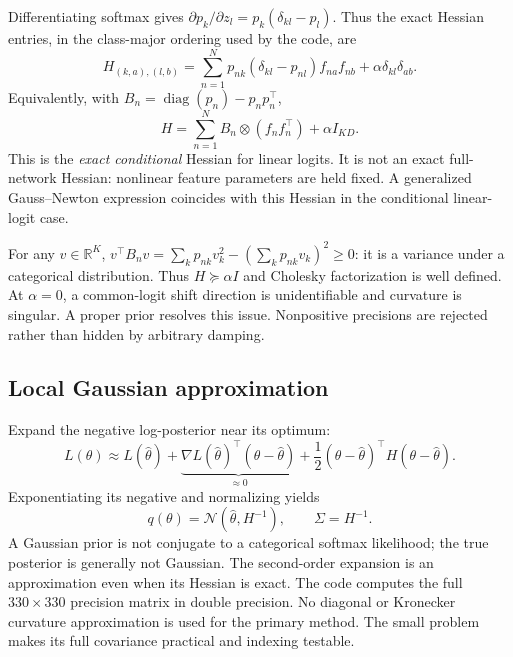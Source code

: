\documentclass[10pt,a4paper]{article}
\newcommand{\R}{\mathbb{R}}
\begin{document}
Differentiating softmax gives
$\partial p_k/\partial z_l=p_k(\delta_{kl}-p_l)$. Thus the exact Hessian
entries, in the class-major ordering used by the code, are
\begin{equation}\label{eq:hessian}
H_{(k,a),(l,b)}=
\sum_{n=1}^N p_{nk}(\delta_{kl}-p_{nl})f_{na}f_{nb}
+\alpha\delta_{kl}\delta_{ab}.
\end{equation}
Equivalently, with $B_n=\operatorname{diag}(p_n)-p_np_n^\top$,
\begin{equation}
H=\sum_{n=1}^N B_n\otimes(f_nf_n^\top)+\alpha I_{KD}.
\end{equation}
This is the \emph{exact conditional} Hessian for linear logits. It is not an
exact full-network Hessian: nonlinear feature parameters are held fixed.
A generalized Gauss--Newton expression coincides with this Hessian in
the conditional linear-logit case.

For any $v\in\R^K$,
$v^\top B_nv=\sum_kp_{nk}v_k^2-(\sum_kp_{nk}v_k)^2\geq0$:
it is a variance under a categorical distribution. Thus
$H\succeq\alpha I$ and Cholesky factorization is well defined. At $\alpha=0$,
a common-logit shift direction is unidentifiable and curvature is singular.
A proper prior resolves this issue. Nonpositive precisions are rejected
rather than hidden by arbitrary damping.

\subsection{Local Gaussian approximation}
Expand the negative log-posterior near its optimum:
\begin{equation}
L(\theta)\approx L(\hat\theta)+
\underbrace{\nabla L(\hat\theta)^\top(\theta-\hat\theta)}_{\approx0}
+\frac12(\theta-\hat\theta)^\top H(\theta-\hat\theta).
\end{equation}
Exponentiating its negative and normalizing yields
\begin{equation}
q(\theta)=\mathcal N(\hat\theta,H^{-1}),\qquad \Sigma=H^{-1}.
\end{equation}
A Gaussian prior is not conjugate to a categorical softmax likelihood; the true
posterior is generally not Gaussian. The second-order expansion is an
approximation even when its Hessian is exact. The code computes the full
$330\times330$ precision matrix in double precision. No diagonal or Kronecker
curvature approximation is used for the primary method. The small problem
makes its full covariance practical and indexing testable.
\end{document}
